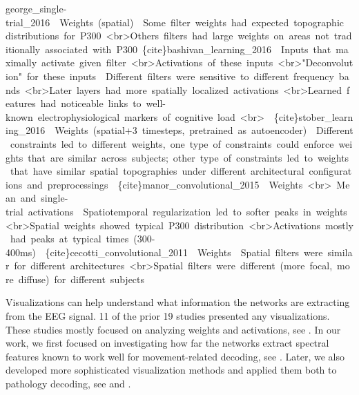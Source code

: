 \documentclass[11pt]{article}
\begin{document}
{    george\_single-trial\_2016\textasciigrave{}\ \textbar{}\ Weights\ (spatial)\ \textbar{}\ Some\ filter\ weights\ had\ expected\ topographic\ distributions\ for\ P300\ \textless{}br\textgreater{}Others\ filters\ had\ large\ weights\ on\ areas\ not\ traditionally\ associated\ with\ P300\textbar{}\ \textbar{}\{cite\}\textasciigrave{}bashivan\_learning\_2016\textasciigrave{}\ \textbar{}\ Inputs\ that\ maximally\ activate\ given\ filter\ \textless{}br\textgreater{}Activations\ of\ these\ inputs\ \textless{}br\textgreater{}"Deconvolution"\ for\ these\ inputs\ \textbar{}\ Different\ filters\ were\ sensitive\ to\ different\ frequency\ bands\ \textless{}br\textgreater{}Later\ layers\ had\ more\ spatially\ localized\ activations\ \textless{}br\textgreater{}Learned\ features\ had\ noticeable\ links\ to\ well-known\ electrophysiological\ markers\ of\ cognitive\ load\ \textless{}br\textgreater{}\ \textbar{}\ \textbar{}\{cite\}\textasciigrave{}stober\_learning\_2016\textasciigrave{}\ \textbar{}\ Weights\ (spatial+3\ timesteps,\ pretrained\ as\ autoencoder)\ \textbar{}\ Different\ constraints\ led\ to\ different\ weights,\ one\ type\ of\ constraints\ could\ enforce\ weights\ that\ are\ similar\ across\ subjects;\ other\ type\ of\ constraints\ led\ to\ weights\ that\ have\ similar\ spatial\ topographies\ under\ different\ architectural\ configurations\ and\ preprocessings\ \textbar{}\ \textbar{}\{cite\}\textasciigrave{}manor\_convolutional\_2015\textasciigrave{}\ \textbar{}\ Weights\ \textless{}br\textgreater{}\ Mean\ and\ single-trial\ activations\ \textbar{}\ Spatiotemporal\ regularization\ led\ to\ softer\ peaks\ in\ weights\ \textless{}br\textgreater{}Spatial\ weights\ showed\ typical\ P300\ distribution\ \textless{}br\textgreater{}Activations\ mostly\ had\ peaks\ at\ typical\ times\ (300-400ms)\ \textbar{}\ \textbar{}\{cite\}\textasciigrave{}cecotti\_convolutional\_2011\textasciigrave{}\ \textbar{}\ Weights\ \textbar{}\ Spatial\ filters\ were\ similar\ for\ different\ architectures\ \textless{}br\textgreater{}Spatial\ filters\ were\ different\ (more\ focal,\ more\ diffuse)\ for\ different\ subjects\ \textbar{}}

    Visualizations can help understand what information the networks are
extracting from the EEG signal. 11 of the prior 19 studies presented any
visualizations. These studies mostly focused on analyzing weights and
activations, see . In
our work, we first focused on investigating how far the networks extract
spectral features known to work well for movement-related decoding, see
. Later, we also developed
more sophisticated visualization methods and applied them both to
pathology decoding, see  and
.
\end{document}
